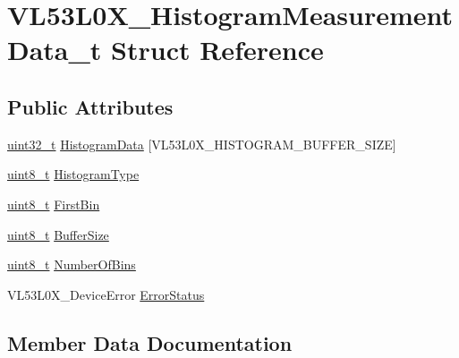 \hypertarget{structVL53L0X__HistogramMeasurementData__t}{}\section{V\+L53\+L0\+X\+\_\+\+Histogram\+Measurement\+Data\+\_\+t Struct Reference}
\label{structVL53L0X__HistogramMeasurementData__t}
\subsection*{Public Attributes}
\begin{DoxyCompactItemize}
\item 
\hyperlink{vl53l0x__types_8h_a435d1572bf3f880d55459d9805097f62}{uint32\+\_\+t} \hyperlink{structVL53L0X__HistogramMeasurementData__t_adcf563d98326766a1b92ad41e84eabf2}{Histogram\+Data} \mbox{[}V\+L53\+L0\+X\+\_\+\+H\+I\+S\+T\+O\+G\+R\+A\+M\+\_\+\+B\+U\+F\+F\+E\+R\+\_\+\+S\+I\+ZE\mbox{]}
\item 
\hyperlink{vl53l0x__types_8h_aba7bc1797add20fe3efdf37ced1182c5}{uint8\+\_\+t} \hyperlink{structVL53L0X__HistogramMeasurementData__t_a713133c2139609ef810ebe5f38cf2f8a}{Histogram\+Type}
\item 
\hyperlink{vl53l0x__types_8h_aba7bc1797add20fe3efdf37ced1182c5}{uint8\+\_\+t} \hyperlink{structVL53L0X__HistogramMeasurementData__t_a2f481a6d3f9090125656097100a4b0b2}{First\+Bin}
\item 
\hyperlink{vl53l0x__types_8h_aba7bc1797add20fe3efdf37ced1182c5}{uint8\+\_\+t} \hyperlink{structVL53L0X__HistogramMeasurementData__t_a342f6defb445fe6d189c9507cf0fd2db}{Buffer\+Size}
\item 
\hyperlink{vl53l0x__types_8h_aba7bc1797add20fe3efdf37ced1182c5}{uint8\+\_\+t} \hyperlink{structVL53L0X__HistogramMeasurementData__t_a6e0891ab8446212c6c6325fb6a183450}{Number\+Of\+Bins}
\item 
V\+L53\+L0\+X\+\_\+\+Device\+Error \hyperlink{structVL53L0X__HistogramMeasurementData__t_a10956a69ce41362e5d289b57089e4a33}{Error\+Status}
\end{DoxyCompactItemize}


\subsection{Member Data Documentation}
\mbox{\label{structVL53L0X__HistogramMeasurementData__t_a342f6defb445fe6d189c9507cf0fd2db}} 
